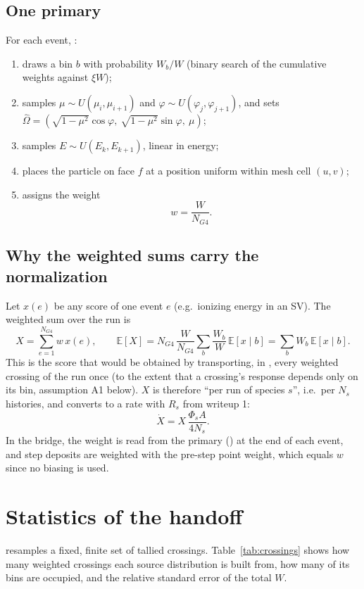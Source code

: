 \subsection{One primary}
For each event, :
\begin{enumerate}
  \item draws a bin $b$ with probability $W_b/W$ (binary search of the cumulative weights against $\xi W$);
  \item samples $\mu \sim U(\mu_i,\mu_{i+1})$ and $\varphi\sim U(\varphi_j,\varphi_{j+1})$, and sets $\hat\Omega = (\sqrt{1-\mu^2}\cos\varphi,\ \sqrt{1-\mu^2}\sin\varphi,\ \mu)$;
  \item samples $E\sim U(E_k,E_{k+1})$, linear in energy;
  \item places the particle on face $f$ at a position uniform within mesh cell $(u,v)$;
  \item assigns the weight
  \begin{equation}
    w = \frac{W}{N_{G4}}.
    \label{eq:weight}
  \end{equation}
\end{enumerate}

\subsection{Why the weighted \gfour{} sums carry the \mcdc{} normalization}
Let $x(e)$ be any score of one \gfour{} event $e$ (e.g.\ ionizing energy in an SV). The weighted sum over the run is
\begin{equation}
  X = \sum_{e=1}^{N_{G4}} w\,x(e),\qquad
  \mathbb{E}[X] = N_{G4}\,\frac{W}{N_{G4}}\sum_b \frac{W_b}{W}\,\mathbb{E}[x\mid b] = \sum_b W_b\,\mathbb{E}[x\mid b].
\end{equation}
This is the score that would be obtained by transporting, in \gfour{}, every weighted crossing of the \mcdc{} run once (to the extent that a crossing's response depends only on its bin, assumption A1 below). $X$ is therefore ``per \mcdc{} run of species $s$'', i.e.\ per $N_s$ histories, and converts to a rate with $R_s$ from writeup 1:
\begin{equation}
  \dot X = X\,\frac{\Phi_s A}{4N_s}.
\end{equation}
In the bridge, the weight is read from the primary () at the end of each event, and step deposits are weighted with the pre-step point weight, which equals $w$ since no biasing is used.

\section{Statistics of the handoff}
\gfour{} resamples a fixed, finite set of tallied crossings. Table~\ref{tab:crossings} shows how many weighted crossings each source distribution is built from, how many of its bins are occupied, and the \mcdc{} relative standard error of the total $W$.

